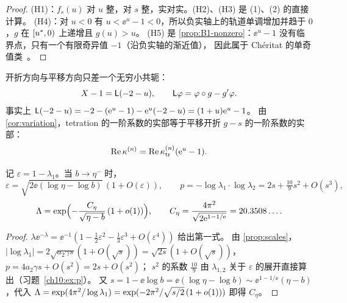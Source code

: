 \begin{proof}
(H1)：$f_s(u)$ 对 $u$ 整，对 $s$ 整，实对实。(H2)、(H3) 是 (1)、(2) 的直接计算。
(H4)：对 $u<0$ 有 $u<\ee^u-1<0$，所以负实轴上的轨道单调增加并趋于 $0$，$g$ 在 $[u^{*},0)$ 上递增且 $g(u)>u$。
(H5) 是 \cref{prop:B1-nonzero}：$\ee^u-1$ 没有临界点，只有一个有限奇异值 $-1$（沿负实轴的渐近值），
因此属于 Chéritat 的单奇值类~\cite[命题~2.4]{KneserPaper}。
\end{proof}

开折方向与平移方向只差一个无穷小共轭：
\begin{equation}\label{ch10:eq:cohomologous}
  X-1=\mathsf L(-2-u),\qquad \mathsf L\varphi=\varphi\circ g-g'\varphi .
\end{equation}
事实上 $\mathsf L(-2-u)=-2-(\mathrm{e}^u-1)-\mathrm{e}^u(-2-u)=(1+u)\mathrm{e}^u-1$。
由 \cref{cor:variation}，tetration 的一阶系数的实部等于平移开折 $g-s$ 的一阶系数的实部：
\begin{equation}\label{ch10:eq:retr}
  \operatorname{Re}\kappa^{(n)}=\operatorname{Re}\kappa_{\mathrm{tr}}^{(n)}(\mathrm{e}^u-1).
\end{equation}

\begin{proposition}[尺度]\label{ch10:prop:scale}
记 $\varepsilon=1-\lambda_1$。当 $b\to\eta^-$ 时，
\[
  \varepsilon=\sqrt{2\ee(\log\eta-\log b)}\,(1+O(\varepsilon)),\qquad
  p=-\log\lambda_1\cdot\log\lambda_2=2s+\tfrac{10}{9}s^2+O(s^3),
\]
\[
  \Lambda=\exp\Bigl(-\frac{C_\eta}{\sqrt{\eta-b}}\,(1+o(1))\Bigr),\qquad
  C_\eta=\frac{4\pi^2}{\sqrt{2\mathrm{e}^{1-1/\mathrm{e}}}}=20.3508\ldots .
\]
\end{proposition}

\begin{proof}
$\lambda\ee^{-\lambda}=\ee^{-1}(1-\tfrac12\varepsilon^2-\tfrac13\varepsilon^3+O(\varepsilon^4))$ 给出第一式。
由 \cref{prop:scales}，$|\log\lambda_1|=2\sqrt{a_2\gamma s}(1+O(\sqrt s))=\sqrt{2s}(1+O(\sqrt s))$，$p=4a_2\gamma s+O(s^2)=2s+O(s^2)$；
$s^2$ 的系数 $\tfrac{10}9$ 由 $\lambda_{1,2}$ 关于 $\varepsilon$ 的展开直接算出（习题~\ref{ch10:ex:p}）。
又 $s=1-\ee\log b=\ee(\log\eta-\log b)\sim\ee^{1-1/\ee}(\eta-b)$，代入
$\Lambda=\exp(4\pi^2/\log\lambda_1)=\exp(-2\pi^2/\sqrt{s/2}\,(1+o(1)))$ 即得 $C_\eta$。
\end{proof}

